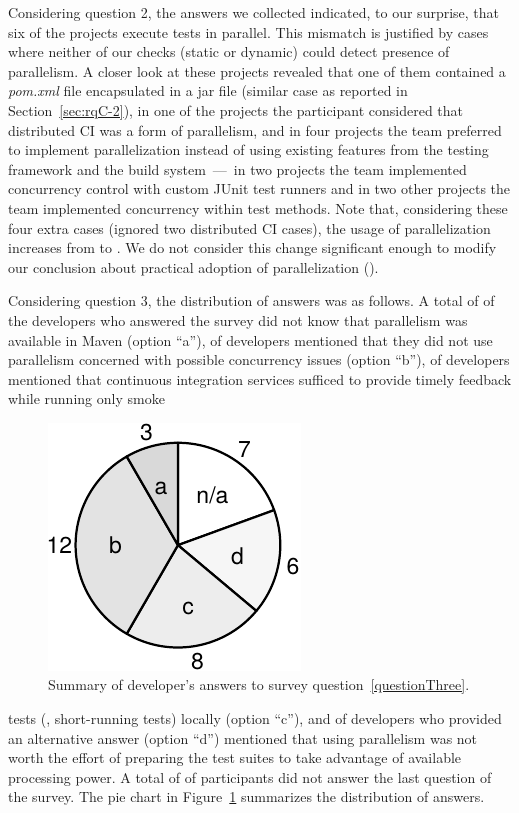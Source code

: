 Considering question 2, the answers we collected indicated, to our
surprise, that six of the \emailsProjectsAnswered{} projects execute
tests in parallel.  This mismatch is justified by cases where neither
of our checks (static or dynamic) could detect presence of
parallelism.  A closer look at these projects revealed that one of
them contained a \emph{pom.xml} file encapsulated in a jar file
(similar case as reported in Section~\ref{sec:rqC-2}), in one of the
projects the participant considered that distributed CI was a form of
parallelism, and in four projects the team preferred to implement
parallelization instead of using existing features from the testing
framework and the build system~---~in two projects the team
implemented concurrency control with custom JUnit test runners and in
two other projects the team implemented concurrency within test
methods.  Note that, considering these four extra cases (ignored two
distributed CI cases), the usage of parallelization increases from
\percentParallel{} to \percentParallelUpdated{}.  We do not consider
this change significant enough to modify our conclusion about
practical adoption of parallelization (\numRQAdoptionOne{}).

Considering question 3, the distribution of answers was as follows.  A
total of \emailsA{} of the \emailsProjectsAnswered{} developers who
answered the survey did not know that parallelism was available in
Maven (option ``a''), \emailsB{} of developers mentioned that they did
not use parallelism concerned with possible concurrency issues (option
``b''), \emailsD{} of developers mentioned that continuous integration
services sufficed to provide timely feedback while running only smoke
\begin{figure}
    \centering
    \includegraphics[width=.15\textwidth]{results/survey.pdf}
    \caption{\label{fig:rq5-answers}Summary of developer's answers to
      survey question~\ref{questionThree}.}
\end{figure}
tests (\ie{}, short-running tests) locally (option ``c''), and \emailsD{} of
developers who provided an alternative answer (option ``d'') mentioned
that using parallelism was not worth the effort of preparing the test
suites to take advantage of available processing power.  A total of
\emailsNA{} of participants did not answer the last question of the
survey.  The pie chart in Figure~\ref{fig:rq5-answers} 
summarizes the distribution of answers.

